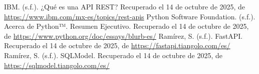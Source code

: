 \documentclass[12pt]{article}
\begin{document}
\begin{thebibliography}{99}

     IBM. (s.f.). ¿Qué es una API REST? Recuperado el 14 de octubre de 2025, de \url{https://www.ibm.com/mx-es/topics/rest-apis}
     Python Software Foundation. (s.f.). Acerca de Python™. Resumen Ejecutivo. Recuperado el 14 de octubre de 2025, de \url{https://www.python.org/doc/essays/blurb-es/}
     Ramírez, S. (s.f.). FastAPI. Recuperado el 14 de octubre de 2025, de \url{https://fastapi.tiangolo.com/es/}
     Ramírez, S. (s.f.). SQLModel. Recuperado el 14 de octubre de 2025, de \url{https://sqlmodel.tiangolo.com/es/}

\end{thebibliography}
\end{document}
